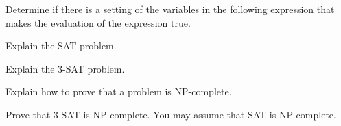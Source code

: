 \begin{questions}
\question
Determine if there is a setting of the variables in the following expression that makes the evaluation of the expression true.

\begin{solution}

\end{solution}


\question
Explain the SAT problem.
\begin{solution}

\end{solution}

\question
Explain the 3-SAT problem.
\begin{solution}

\end{solution}

\question
Explain how to prove that a problem is NP-complete.
\begin{solution}

\end{solution}


\question
Prove that 3-SAT is NP-complete. You may assume that SAT is NP-complete.
\begin{solution}

\end{solution}

\end{questions}
